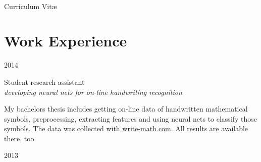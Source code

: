 \documentclass[a4paper,10pt]{article} %
\begin{document}
\color{text1} %


\par{\\ %
{\Huge \color{headings} Curriculum {Vit\ae}\\[15pt]\par}


\begin{minipage}[t]{0.5\textwidth}
\vspace{0pt} %


\section{Work Experience}


{\raggedleft\textsc{2014}\par}

{\raggedright\large Student research assistant\\
\textit{developing neural nets for on-line handwriting recognition}\\[5pt]}

\normalsize{My bachelors thesis includes getting on-line data of handwritten
mathematical symbols, preprocessing, extracting features and using neural nets
to classify those symbols. The data was collected with \href{http://write-math.com}{write-math.com}. All results are available there, too.}\\


{\raggedleft\textsc{2013}\par}


\end{minipage}}
\end{document}
